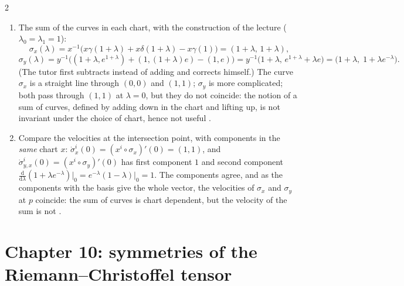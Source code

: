 \begin{paracol}{2}
\begin{enumerate}
  \item The sum of the curves in each chart, with the construction of the lecture ($\lambda_0=\lambda_1=1$):
        \[
          \sigma_x(\lambda)=x^{-1}\bigl(x\gamma(1+\lambda)+x\delta(1+\lambda)-x\gamma(1)\bigr)=(1+\lambda,\,1+\lambda),
        \]
        \[
          \sigma_y(\lambda)=y^{-1}\bigl((1+\lambda,e^{1+\lambda})+(1,(1+\lambda)e)-(1,e)\bigr)=y^{-1}\bigl(1+\lambda,\,e^{1+\lambda}+\lambda e\bigr)=\bigl(1+\lambda,\;1+\lambda e^{-\lambda}\bigr).
        \]
        (The tutor first subtracts instead of adding and corrects himself.) The curve $\sigma_x$ is a straight line through $(0,0)$ and $(1,1)$; $\sigma_y$ is more complicated; both pass through $(1,1)$ at $\lambda=0$, but they do not coincide: the notion of a sum of curves, defined by adding down in the chart and lifting up, is not invariant under the choice of chart, hence not useful
        .
  \item Compare the velocities at the intersection point, with components in the \emph{same} chart $x$: $\dot\sigma^i_{x}(0)=(x^i\circ\sigma_x)'(0)=(1,1)$, and $\dot\sigma^i_{y,x}(0)=(x^i\circ\sigma_y)'(0)$ has first component $1$ and second component $\frac{\mathrm d}{\mathrm d\lambda}(1+\lambda e^{-\lambda})\big|_0=e^{-\lambda}(1-\lambda)\big|_0=1$. The components agree, and as the components with the basis give the whole vector, the velocities of $\sigma_x$ and $\sigma_y$ at $p$ coincide: the sum of curves is chart dependent, but the velocity of the sum is not
        .
\end{enumerate}

\section*{Chapter 10: symmetries of the Riemann--Christoffel tensor}\label{app:c10-riemann}


\end{paracol}
